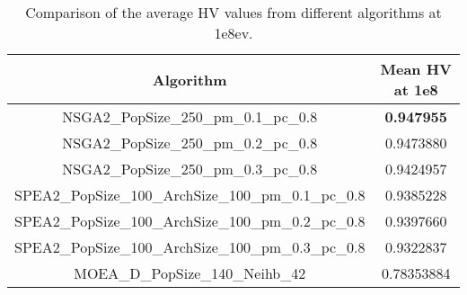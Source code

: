 \begin{table}[H]
\centering
\begin{tabular}{|c|c|}
\hline
\textbf{Algorithm} & \textbf{Mean HV at 1e8} \\ \hline
NSGA2\_PopSize\_250\_pm\_0.1\_pc\_0.8 & \textbf{0.947955} \\ \hline
NSGA2\_PopSize\_250\_pm\_0.2\_pc\_0.8 & 0.9473880 \\ \hline
NSGA2\_PopSize\_250\_pm\_0.3\_pc\_0.8 & 0.9424957 \\ \hline
SPEA2\_PopSize\_100\_ArchSize\_100\_pm\_0.1\_pc\_0.8 & 0.9385228 \\ \hline
SPEA2\_PopSize\_100\_ArchSize\_100\_pm\_0.2\_pc\_0.8 & 0.9397660 \\ \hline
SPEA2\_PopSize\_100\_ArchSize\_100\_pm\_0.3\_pc\_0.8 & 0.9322837 \\ \hline
MOEA\_D\_PopSize\_140\_Neihb\_42 & 0.78353884 \\ \hline
\end{tabular}
\caption{Comparison of the average HV values from different algorithms at 1e8ev.}
\label{table:compare}
\end{table}